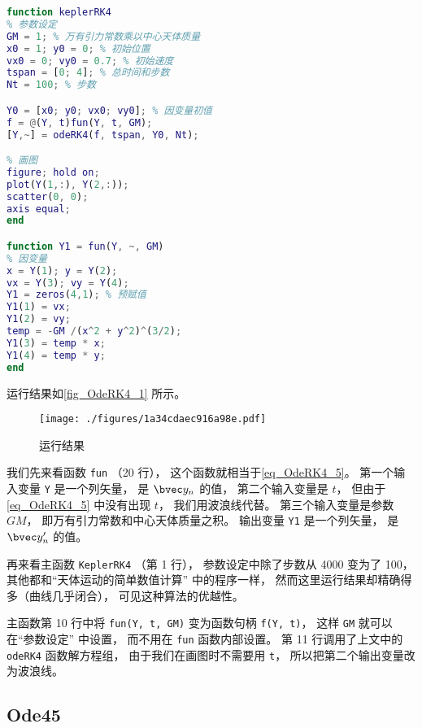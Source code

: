 \begin{lstlisting}[language=matlab, caption=keplerRK4.m]
function keplerRK4
% 参数设定
GM = 1; % 万有引力常数乘以中心天体质量
x0 = 1; y0 = 0; % 初始位置
vx0 = 0; vy0 = 0.7; % 初始速度
tspan = [0; 4]; % 总时间和步数
Nt = 100; % 步数

Y0 = [x0; y0; vx0; vy0]; % 因变量初值
f = @(Y, t)fun(Y, t, GM);
[Y,~] = odeRK4(f, tspan, Y0, Nt);

% 画图
figure; hold on;
plot(Y(1,:), Y(2,:));
scatter(0, 0);
axis equal;
end

function Y1 = fun(Y, ~, GM)
% 因变量
x = Y(1); y = Y(2);
vx = Y(3); vy = Y(4);
Y1 = zeros(4,1); % 预赋值
Y1(1) = vx;
Y1(2) = vy;
temp = -GM /(x^2 + y^2)^(3/2);
Y1(3) = temp * x;
Y1(4) = temp * y;
end
\end{lstlisting}

运行结果如\autoref{fig_OdeRK4_1} 所示。

\begin{figure}[ht]
\centering
\texttt{[image: ./figures/1a34cdaec916a98e.pdf]}
\caption{运行结果} \label{fig_OdeRK4_1}
\end{figure}

我们先来看函数 \verb|fun| （20 行）， 这个函数就相当于\autoref{eq_OdeRK4_5}。 第一个输入变量 \verb|Y| 是一个列矢量， 是 $\bvec y_n$ 的值， 第二个输入变量是 $t$， 但由于\autoref{eq_OdeRK4_5} 中没有出现 $t$， 我们用波浪线代替。 第三个输入变量是参数 $GM$， 即万有引力常数和中心天体质量之积。 输出变量 \verb|Y1| 是一个列矢量， 是 $\bvec y'_n$ 的值。

再来看主函数 \verb|KeplerRK4| （第 1 行）， 参数设定中除了步数从 4000 变为了 100， 其他都和“天体运动的简单数值计算” 中的程序一样， 然而这里运行结果却精确得多（曲线几乎闭合）， 可见这种算法的优越性。

主函数第 10 行中将 \verb|fun(Y, t, GM)| 变为函数句柄 \verb|f(Y, t)|， 这样 \verb|GM| 就可以在“参数设定” 中设置， 而不用在 \verb|fun| 函数内部设置。 第 11 行调用了上文中的 \verb|odeRK4| 函数解方程组， 由于我们在画图时不需要用 \verb|t|， 所以把第二个输出变量改为波浪线。

\subsection{Ode45}
